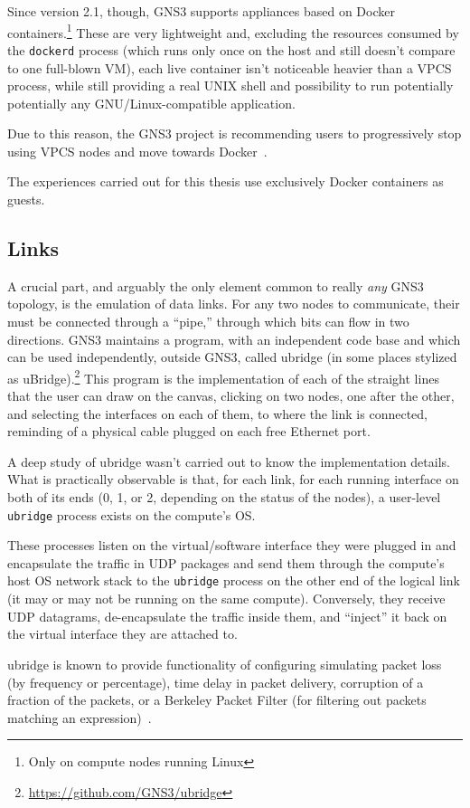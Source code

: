 Since version 2.1, though, GNS3 supports appliances based on Docker containers.\footnote{Only on compute nodes running Linux}
These are very lightweight and, excluding the resources consumed by the \texttt{dockerd} process (which runs only once on the host and still doesn't compare to one full-blown VM), each live container isn't noticeable heavier than a VPCS process, while still providing a real UNIX shell and possibility to run potentially potentially any GNU/Linux-compatible application.  %

Due to this reason, the GNS3 project is recommending users to progressively stop using VPCS nodes and move towards Docker~\cite{ytdynamipsvpcs}.

The experiences carried out for this thesis use exclusively Docker containers as guests.

\subsection{Links}
\label{subsec:links}

A crucial part, and arguably the only element common to really \emph{any} GNS3 topology, is the emulation of data links.
For any two nodes to communicate, their  must be connected through a ``pipe,'' through which bits can flow in two directions.
GNS3 maintains a program, with an independent code base and which can be used independently, outside GNS3, called ubridge (in some places stylized as uBridge).\footnote{\url{https://github.com/GNS3/ubridge}}
This program is the implementation of each of the straight lines that the user can draw on the canvas, clicking on two nodes, one after the other, and selecting the interfaces on each of them, to where the link is connected, reminding of a physical cable plugged on each free Ethernet port.

A deep study of ubridge wasn't carried out to know the implementation details.
What is practically observable is that, for each link, for each running interface on both of its ends (0, 1, or 2, depending on the status of the nodes), a user-level \texttt{ubridge} process exists on the compute's OS.

These processes listen on the virtual/software interface they were plugged in and encapsulate the traffic in UDP packages and send them through the compute's host OS network stack to the \texttt{ubridge} process on the other end of the logical link (it may or may not be running on the same compute). %
Conversely, they receive UDP datagrams, de-encapsulate the traffic inside them, and ``inject'' it back on the virtual interface they are attached to.


ubridge is known to provide functionality of configuring simulating packet loss (by frequency or percentage), time delay in packet delivery, corruption of a fraction of the packets, or a Berkeley Packet Filter (for filtering out packets matching an expression)~\cite{ubridgereadme}.

